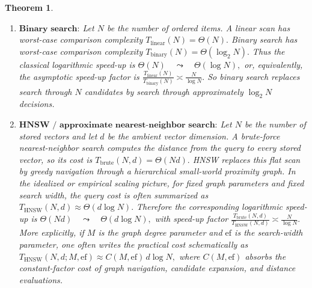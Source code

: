 \documentclass[11pt]{article}
\newtheorem{theorem}{Theorem}
\begin{document}
\begin{theorem}\label{thm: HNSW log speedup}
\begin{enumerate}
\item
$
\textbf{Binary search:}
$
Let \(N\) be the number of ordered items.
A linear scan has worst-case comparison complexity
$
T_{\mathrm{linear}}(N) = \Theta(N).
$
Binary search has worst-case comparison complexity
$
T_{\mathrm{binary}}(N) = \Theta(\log_2 N).
$
Thus the classical logarithmic speed-up is
$
\Theta(N)
\quad\leadsto\quad
\Theta(\log N),
$
or, equivalently, the asymptotic speed-up factor is
$
\frac{T_{\mathrm{linear}}(N)}
     {T_{\mathrm{binary}}(N)}
\asymp
\frac{N}{\log N}.
$
So binary search replaces search through \(N\) candidates by search through
approximately \(\log_2 N\) decisions.
\item
$
\textbf{HNSW / approximate nearest-neighbor search:}
$
Let \(N\) be the number of stored vectors and let \(d\) be the ambient
vector dimension.
A brute-force nearest-neighbor search computes the distance from the query
to every stored vector, so its cost is
$
T_{\mathrm{brute}}(N,d) = \Theta(Nd).
$
HNSW replaces this flat scan by greedy navigation through a hierarchical
small-world proximity graph.  In the idealized or empirical scaling picture,
for fixed graph parameters and fixed search width, the query cost is often
summarized as
$
T_{\mathrm{HNSW}}(N,d)
\approx
\Theta(d \log N).
$
Therefore the corresponding logarithmic speed-up is
$
\Theta(Nd)
\quad\leadsto\quad
\Theta(d\log N),
$
with speed-up factor
$
\frac{T_{\mathrm{brute}}(N,d)}
     {T_{\mathrm{HNSW}}(N,d)}
\asymp
\frac{N}{\log N}.
$
More explicitly, if \(M\) is the graph degree parameter and
\(\mathrm{ef}\) is the search-width parameter, one often writes the
practical cost schematically as
$
T_{\mathrm{HNSW}}(N,d;M,\mathrm{ef})
\approx
C(M,\mathrm{ef})\, d \log N,
$
where \(C(M,\mathrm{ef})\) absorbs the constant-factor cost of graph
navigation, candidate expansion, and distance evaluations.
\end{enumerate}
\end{theorem}
\end{document}
